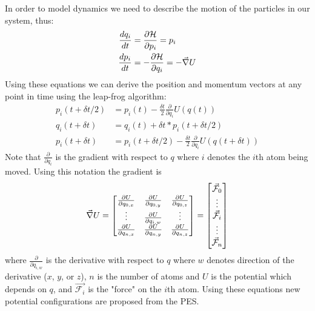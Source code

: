 In order to model dynamics we need to describe the motion of the particles in our system, thus:
\begin{align}
  \frac{d q_{i}}{d t} &= \frac{\partial \mathcal{H}}{\partial p_{i}} = p_{i}\\
  \frac{d p_{i}}{d t} &= -\frac{\partial \mathcal{H}}{\partial q_{i}} = -\vec{\nabla} U
\end{align}
Using these equations we can derive the position and momentum vectors at any point in time using the leap-frog algorithm:
\begin{align}
  p_{i}(t + \delta t/2) &= p_{i}(t) - \frac{\delta t}{2} \frac{\partial }{\partial q_{i}}U(q(t))\\
  q_{i}(t+\delta t)  &= q_{i}(t) + \delta t * p_{i}(t+\delta t/2)\\
  p_{i}(t+\delta t) &=   p_{i}(t + \delta t/2)- \frac{\delta t}{2} \frac{\partial }{\partial q_{i}}U(q(t+\delta t))
\end{align}
Note that $\frac{\partial}{\partial q_{i}}$ is the gradient with respect to $q$ where $i$ denotes the $i$th atom being moved.
Using this notation the gradient is
\begin{equation} \label{grad}
  \vec{\nabla} U = \begin{bmatrix}
    \frac{\partial U}{\partial q_{0, x}} & \frac{\partial U}{\partial q_{0, y}} & \frac{\partial U}{\partial q_{0, z}} \\
    \vdots & \frac{\partial U}{\partial q_{i, w}} & \vdots \\
    \frac{\partial U}{\partial q_{n, x}} & \frac{\partial U}{\partial q_{n, y}} & \frac{\partial U}{\partial q_{n, z}} \\
  \end{bmatrix} =
  \begin{bmatrix}
    \vec{\mathcal{F}}_{0} \\
    \vdots \\
    \vec{\mathcal{F}}_{i} \\
    \vdots \\
    \vec{\mathcal{F}}_{n}\\
  \end{bmatrix}
\end{equation}
where $\frac{\partial}{\partial q_{i, w}}$ is the derivative with respect to $q$ where $w$ denotes direction of the derivative ($x$, $y$, or $z$),  $n$ is the number of atoms and $U$ is the potential which depends on $q$, and $\vec{\mathcal{F}_{i}}$ is the "force" on the $i$th atom.
Using these equations new potential configurations are proposed from the PES.
